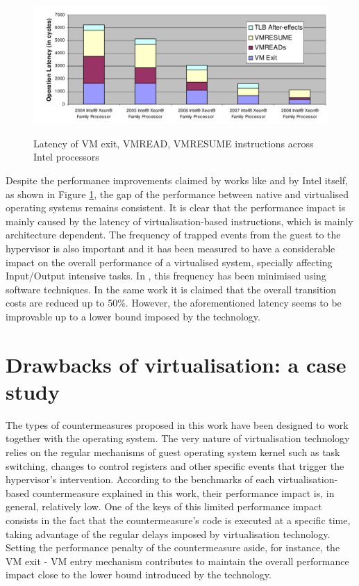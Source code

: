 \begin{figure}[!htbp] 
\begin{center}
\includegraphics[scale=0.27]{images/intel_latency}
\caption{{Latency of VM exit, VMREAD, VMRESUME instructions across Intel processors}}
\vspace{0.1cm}
\label{intel_latency}
\end{center}
\end{figure}


Despite the performance improvements claimed by works like \cite{rearch, avoidvmexit} and by Intel itself, as shown in Figure \ref{intel_latency}, the gap of the performance between native and virtualised operating systems remains consistent.  
It is clear that the performance impact is mainly caused by the latency of virtualisation-based instructions, which is mainly architecture dependent. The frequency of trapped events from the guest to the hypervisor is also important and it has been measured to have a considerable impact on the overall performance of a virtualised system, specially affecting Input/Output intensive tasks. In \cite{avoidvmexit}, this frequency has been minimised using software techniques. In the same work it is claimed that the overall transition costs are reduced up to 50\%. However, the aforementioned latency seems to be improvable up to a lower bound imposed by the technology. %







\section{Drawbacks of virtualisation: a case study}\label{virt:drawback}
The types of countermeasures proposed in this work have been designed to work together with the operating system.  The very nature of virtualisation technology relies on the regular mechanisms of guest operating system kernel such as task switching, changes to control registers and other specific events that trigger the hypervisor's intervention.
According to the benchmarks of each virtualisation-based countermeasure explained in this work, their performance impact is, in general, relatively low. One of the keys of this limited performance impact consists in the fact that the countermeasure's code is executed at a specific time, taking advantage of the regular delays imposed by virtualisation technology. Setting the performance penalty of the countermeasure aside, for instance, the VM exit - VM entry mechanism contributes to maintain the overall performance impact close to the lower bound introduced by the technology. 

